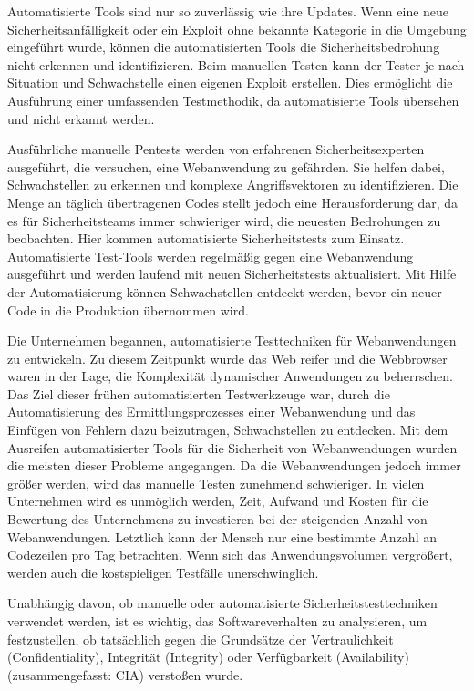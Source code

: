 Automatisierte Tools sind nur so zuverlässig wie ihre Updates. Wenn eine neue Sicherheitsanfälligkeit oder ein Exploit ohne bekannte Kategorie in die Umgebung eingeführt wurde, können die automatisierten Tools die Sicherheitsbedrohung nicht erkennen und identifizieren. Beim manuellen Testen kann der Tester je nach Situation und Schwachstelle einen eigenen Exploit erstellen. Dies ermöglicht die Ausführung einer umfassenden Testmethodik, da automatisierte Tools übersehen und nicht erkannt werden\cite{packetlabs18}.

Ausführliche manuelle Pentests werden von erfahrenen Sicherheitsexperten ausgeführt, die versuchen, eine Webanwendung zu gefährden. Sie helfen dabei, Schwachstellen zu erkennen und komplexe Angriffsvektoren zu identifizieren. Die Menge an täglich übertragenen Codes stellt jedoch eine Herausforderung dar, da es für Sicherheitsteams immer schwieriger wird, die neuesten Bedrohungen zu beobachten. Hier kommen automatisierte Sicherheitstests zum Einsatz. Automatisierte Test-Tools werden regelmäßig gegen eine Webanwendung ausgeführt und werden laufend mit neuen Sicherheitstests aktualisiert. Mit Hilfe der Automatisierung können Schwachstellen entdeckt werden, bevor ein neuer Code in die Produktion übernommen wird\cite{wmpta17}.

Die Unternehmen begannen, automatisierte Testtechniken für Webanwendungen zu entwickeln. Zu diesem Zeitpunkt wurde das Web reifer und die Webbrowser waren in der Lage, die Komplexität dynamischer Anwendungen zu beherrschen. Das Ziel dieser frühen automatisierten Testwerkzeuge war, durch die Automatisierung des Ermittlungsprozesses einer Webanwendung und das Einfügen von Fehlern dazu beizutragen, Schwachstellen zu entdecken. Mit dem Ausreifen automatisierter Tools für die Sicherheit von Webanwendungen wurden die meisten dieser Probleme angegangen. Da die Webanwendungen jedoch immer größer werden, wird das manuelle Testen zunehmend schwieriger. In vielen Unternehmen wird es unmöglich werden, Zeit, Aufwand und Kosten für die Bewertung des Unternehmens zu investieren bei der steigenden Anzahl von Webanwendungen. Letztlich kann der Mensch nur eine bestimmte Anzahl an Codezeilen pro Tag betrachten. Wenn sich das Anwendungsvolumen vergrößert, werden auch die kostspieligen Testfälle unerschwinglich\cite[2--5]{wasasibm08}.

Unabhängig davon, ob manuelle oder automatisierte Sicherheitstesttechniken verwendet werden, ist es wichtig, das Softwareverhalten zu analysieren, um festzustellen, ob tatsächlich gegen die Grundsätze der Vertraulichkeit (Confidentiality), Integrität (Integrity) oder Verfügbarkeit (Availability) (zusammengefasst: CIA) verstoßen wurde\cite{moaast17}.











